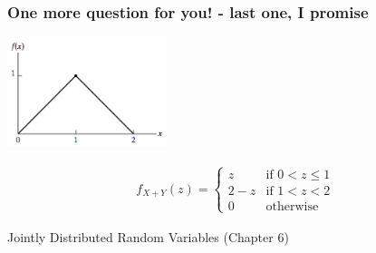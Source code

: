 \documentclass[slidestop,compress,mathserif]{beamer}
\begin{document}
\begin{frame}\frametitle{One more question for you! - last one, I promise}


\pause

\begin{center}
\includegraphics[width=0.35\textwidth]{figures/triangle_density}
\end{center}

\begin{align*}
f_{X+Y}(z)   =  \begin{cases}
              z & \text{if $0<z\leq1$} \\
              2-z & \text{if $1<z<2$}\\
              0 & \text{otherwise}
              \end{cases}
\end{align*}

{\color{VassarRed}Jointly Distributed Random Variables (Chapter 6)}



\end{frame}
\end{document}
